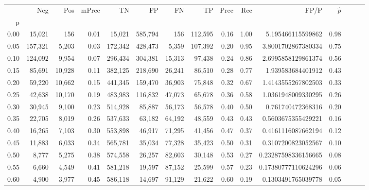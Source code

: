 \begin{tabular}{rrrrrrrrrrrrrrr}
\toprule
{} &      Neg &     Pos & mPrec &       TN &       FP &       FN &       TP &  Prec &   Rec &                  FP/P & $\hat{p}$ \\
p    &          &         &       &          &          &          &          &       &       &                       &           \\
\midrule
0.00 &   15,021 &     156 &  0.01 &   15,021 &  585,794 &      156 &  112,595 &  0.16 &  1.00 &     5.195466115599862 &      0.98 \\
0.05 &  157,321 &   5,203 &  0.03 &  172,342 &  428,473 &    5,359 &  107,392 &  0.20 &  0.95 &    3.8001702867380334 &      0.75 \\
0.10 &  124,092 &   9,954 &  0.07 &  296,434 &  304,381 &   15,313 &   97,438 &  0.24 &  0.86 &    2.6995858129861374 &      0.56 \\
0.15 &   85,691 &  10,928 &  0.11 &  382,125 &  218,690 &   26,241 &   86,510 &  0.28 &  0.77 &     1.939583684401912 &      0.43 \\
0.20 &   59,220 &  10,662 &  0.15 &  441,345 &  159,470 &   36,903 &   75,848 &  0.32 &  0.67 &    1.4143555267802503 &      0.33 \\
0.25 &   42,638 &  10,170 &  0.19 &  483,983 &  116,832 &   47,073 &   65,678 &  0.36 &  0.58 &    1.0361948009330295 &      0.26 \\
0.30 &   30,945 &   9,100 &  0.23 &  514,928 &   85,887 &   56,173 &   56,578 &  0.40 &  0.50 &     0.761740472368316 &      0.20 \\
0.35 &   22,705 &   8,019 &  0.26 &  537,633 &   63,182 &   64,192 &   48,559 &  0.43 &  0.43 &    0.5603675355429221 &      0.16 \\
0.40 &   16,265 &   7,103 &  0.30 &  553,898 &   46,917 &   71,295 &   41,456 &  0.47 &  0.37 &    0.4161116087662194 &      0.12 \\
0.45 &   11,883 &   6,033 &  0.34 &  565,781 &   35,034 &   77,328 &   35,423 &  0.50 &  0.31 &    0.3107200823052567 &      0.10 \\
0.50 &    8,777 &   5,275 &  0.38 &  574,558 &   26,257 &   82,603 &   30,148 &  0.53 &  0.27 &   0.23287598336156665 &      0.08 \\
0.55 &    6,660 &   4,549 &  0.41 &  581,218 &   19,597 &   87,152 &   25,599 &  0.57 &  0.23 &   0.17380777110624296 &      0.06 \\
0.60 &    4,900 &   3,977 &  0.45 &  586,118 &   14,697 &   91,129 &   21,622 &  0.60 &  0.19 &    0.1303491765039778 &      0.05 \\

\end{tabular}
